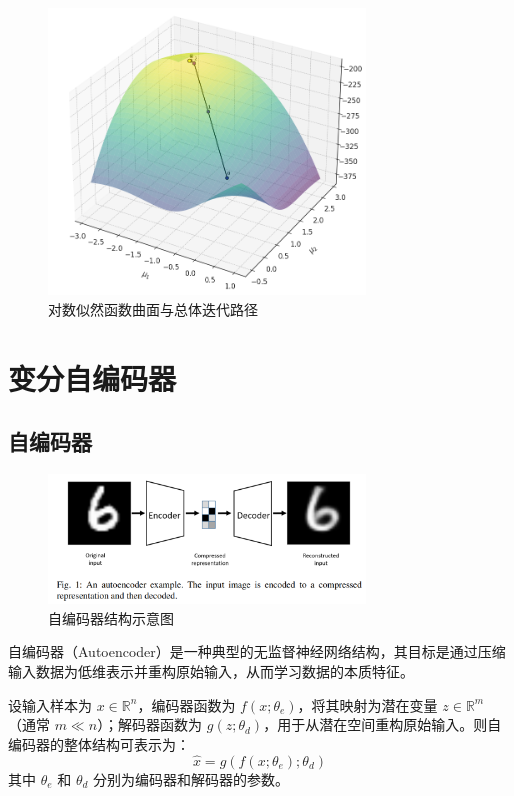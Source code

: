 \documentclass[12pt,a4paper]{article}
\begin{document}
\begin{figure}[H]
  \centering
  \includegraphics[width=0.75\textwidth]{../images/output2.png}
  \caption{对数似然函数曲面与总体迭代路径}
  \label{fig:likelihood_surface}
\end{figure}
\section{变分自编码器}

\subsection{自编码器}
\begin{figure}[H]
  \centering
  \includegraphics[width=0.75\textwidth]{../images/ae.png}
  \caption{自编码器结构示意图}
  \label{fig:ae}
\end{figure}

自编码器（Autoencoder）是一种典型的无监督神经网络结构，其目标是通过压缩输入数据为低维表示并重构原始输入，从而学习数据的本质特征。

设输入样本为 $x \in \mathbb{R}^n$，编码器函数为 $f(x; \theta_e)$，将其映射为潜在变量 $z \in \mathbb{R}^m$（通常 $m \ll n$）；解码器函数为 $g(z; \theta_d)$，用于从潜在空间重构原始输入。则自编码器的整体结构可表示为：
\[
\hat{x} = g(f(x; \theta_e); \theta_d)
\]
其中 $\theta_e$ 和 $\theta_d$ 分别为编码器和解码器的参数。
\end{document}
